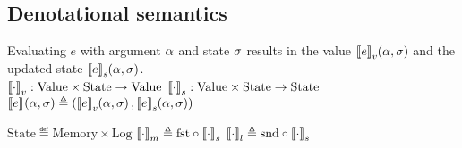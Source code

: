 \subsection*{Denotational semantics}

Evaluating $e$ with argument $\targ$ and state $\tmem$ results in the value $\denotefv{e}{\targ,\tmem}$ and the updated state $\denotefs{e}{\targ,\tmem}$.\\
$\denotevalue{\cdot} : \mathrm{Value} \times \mathrm{State} \to \mathrm{Value}$\quad\quad
$\denotestate{\cdot} : \mathrm{Value} \times \mathrm{State} \to \mathrm{State}$\quad\quad
$\denotef{e}{\targ,\tmem} \eqdef \left(\denotefv{e}{\targ,\tmem},\denotefs{e}{\targ,\tmem}\right)$

$\mathrm{State} \eqdef \mathrm{Memory} \times \mathrm{Log}$\quad\quad
$\denotesub{m}{\cdot} \triangleq \mathrm{fst} \circ \denotestate{\cdot}$\quad\quad
$\denotesub{l}{\cdot} \triangleq \mathrm{snd} \circ \denotestate{\cdot}$

